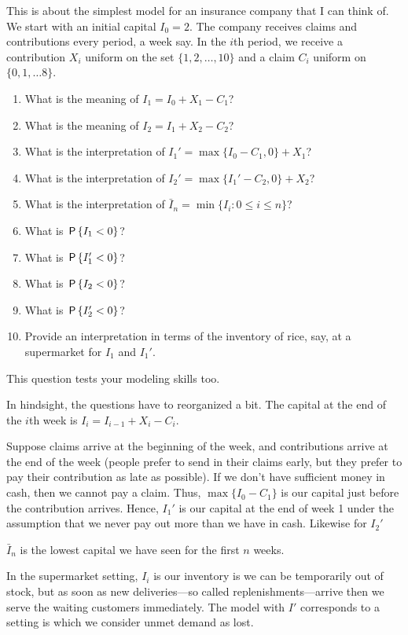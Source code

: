 \documentclass[../../assignments/assignments]{subfiles}
\begin{document}
\begin{exercise}
This is about the simplest model for an insurance company that I can think of.
We start with an initial capital $I_0=2$.
The company receives claims and contributions every period, a week say.
In the $i$th period, we receive a contribution $X_{i}$ uniform on the set $\{1, 2,\ldots,10\}$ and a claim $C_i$ uniform on $\{0, 1, \ldots 8\}$.
\begin{enumerate}
\item What is the meaning of $I_1=I_0+X_1-C_1$?
\item What is the meaning of $I_2=I_1+X_2-C_2$?
\item What is the interpretation of $I_1'=\max\{I_0-C_1,0\} + X_1$?
\item What is the interpretation of $I_2'=\max\{I_1'-C_2,0\} + X_2$?
\item What is the interpretation of $\bar I_{n} = \min\{I_{i} : 0\leq i\leq n\}$?
\item What is  $\P{I_1 < 0}$?
\item What is  $\P{I_1' < 0}$?
\item What is  $\P{I_2 < 0}$?
\item What is  $\P{I_2' < 0}$?
\item Provide an interpretation in terms of the inventory of rice, say, at a supermarket for $I_{1}$ and $I_{1}'$.
\end{enumerate}
\begin{solution}
This question tests your modeling skills too.

In hindsight, the questions have to reorganized a bit.
The capital at the end of the $i$th week is $I_{i} = I_{i-1} + X_{i} - C_{i}$.

Suppose claims arrive at the beginning of the week, and contributions arrive at the end of the week (people prefer to send in their claims early, but they prefer to pay their contribution as late as possible).
If we don't have sufficient money in cash, then we cannot pay a claim.
Thus, $\max\{I_{0}-C_{1}\}$ is our capital just before the contribution arrives. Hence, $I_{1}'$ is our capital at the end of week 1 under the assumption that we never pay out more than we have in cash. Likewise for $I_{2}'$

$\bar I_{n}$ is the lowest capital we have seen for the first $n$ weeks.

In the supermarket setting, $I_{i}$ is our inventory is we can be temporarily out of stock, but as soon as new deliveries---so called replenishments---arrive then we serve the waiting customers immediately.
The model with $I'$ corresponds to a setting is which we consider unmet demand as lost.


\end{solution}
\end{exercise}
\end{document}
